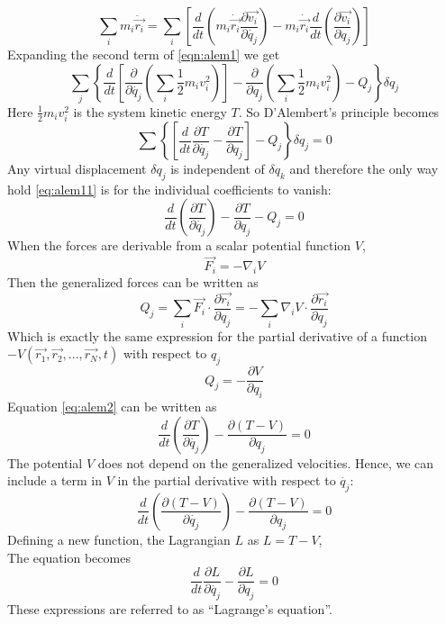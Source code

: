\documentclass[12pt]{article}
\begin{document}
\begin{soln}
    \[
        \sum_i m_i\ddot{\vec{r_i}}=\sum_i\left[\frac{d}{dt}\left( m_i\dot{\vec{r_i}}\frac{\partial \vec{v_i}}{\partial \dot{q_j}} \right)-m_i\dot{\vec{r_i}}\frac{d}{dt}\left( \frac{\partial \vec{v_i}}{\partial q_j} \right)\right]
        \]
        Expanding the second term of \eqref{eqn:alem1} we get
        \[
            \sum_j \left\{ \frac{d}{dt}\left[ \frac{\partial}{\partial \dot{q_j}}\left( \sum_i \frac{1}{2}m_iv_i^2 \right) \right]-\frac{\partial}{\partial q_j}\left( \sum_i \frac{1}{2}m_iv_i^2 \right)-Q_j \right\}\delta q_j
\]
Here \(\frac{1}{2} m_iv_i^2\) is the system kinetic energy \(T\). So D'Alembert's principle becomes 
\begin{equation}
    \sum \left\{ \left[ \frac{d}{dt}\frac{\partial T}{\partial \dot{q_j}}-\frac{\partial T}{\partial q_j} \right]-Q_j \right\}\delta q_j=0
    \label{eq:alem11}
\end{equation}
Any virtual displacement \(\delta q_j\) is independent of \(\delta q_k\) and therefore the only way hold \eqref{eq:alem11} is for the individual coefficients to vanish:
\begin{equation}
    \frac{d}{dt} \left(\frac{\partial T}{\partial \dot{q_j}}\right)-\frac{\partial T}{\partial q_j} -Q_j =0
    \label{eq:alem2}
\end{equation}
When the forces are derivable from a scalar potential function \(V\),
\[
    \vec{F_i}=-\nabla_i V
    \]
    Then the generalized forces can be written as 
    \[
        Q_j=\sum_i \vec{F_i}\cdot\frac{\partial \vec{r_i}}{\partial q_j}=-\sum_i \nabla_i V\cdot\frac{\partial \vec{r_i}}{\partial q_j}
        \]
        Which is exactly the same expression for the partial derivative of a function \(-V(\vec{r_1},\vec{r_2},\dots,\vec{r_N},t)\) with respect to \(q_j\)
        \[
    Q_j=-\frac{\partial V}{\partial q_i}
\]
Equation \eqref{eq:alem2} can be written as 
\[
    \frac{d}{dt}\left( \frac{\partial T}{\partial \dot{q_j}} \right)-\frac{\partial (T-V)}{\partial q_j}=0
\]
The potential \(V\) does not depend on the generalized velocities. Hence, we can include a term in \(V\) in the partial derivative with respect to \(\dot{q_j}\):
\[
    \frac{d}{dt}\left( \frac{\partial (T-V)}{\partial \dot{q_j}} \right)-\frac{\partial (T-V)}{\partial q_j}=0
\]
Defining a new function, the Lagrangian \(L\) as \(L=T-V\),\\
The equation becomes
\[
    \frac{d}{dt}\frac{\partial L}{\partial \dot{q_j}}-\frac{\partial L}{\partial q_j}=0
\]
These expressions are referred to as ``Lagrange's equation''.
\end{soln}
\end{document}
